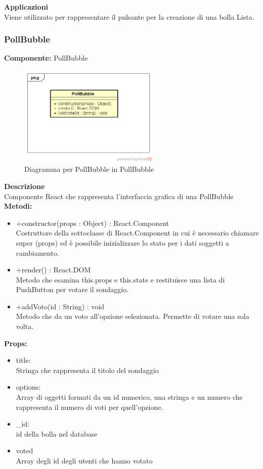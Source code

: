 \textbf{Applicazioni}\\
Viene utilizzato per rappresentare il pulsante per la creazione di una bolla Lista. 


\clearpage

\subsubsection{PollBubble}
\textbf{Componente:}  PollBubble\\
   \FloatBarrier
   \begin{figure}[ht]
   \centering
   \includegraphics[width=0.6\textwidth]{img/single-PollBubble.png}
   \caption{{Diagramma per PollBubble in PollBubble}}
\end{figure}
\FloatBarrier
\textbf{Descrizione}\\
Componente React che rappresenta l'interfaccia grafica di una PollBubble
\\
\textbf{Metodi:} 
\begin{itemize}
\item +constructor(props : Object) : React.Component 
\\
Costruttore della sottoclasse di React.Component in cui è necessario chiamare super (props) ed è possibile inizializzare lo stato per i dati soggetti a cambiamento.

\item +render() : React.DOM 
\\
Metodo che esamina this.props e this.state e restituisce una lista di PushButton per votare il sondaggio. 

\item +addVoto(id : String) : void \\
Metodo che da un voto all'opzione selezionata. Permette di votare una sola volta.

\end{itemize}

\textbf{Props:} 
\begin{itemize}
\item title: 
\\
Stringa che rappresenta il titolo del sondaggio
\item options: 
\\
Array di oggetti formati da un id numerico, una stringa e un numero che rappresenta il numero di voti per quell'opzione.
\item \_id:
\\
id della bolla nel database
\item voted
\\
Array degli id degli utenti che hanno votato
\end{itemize} 


